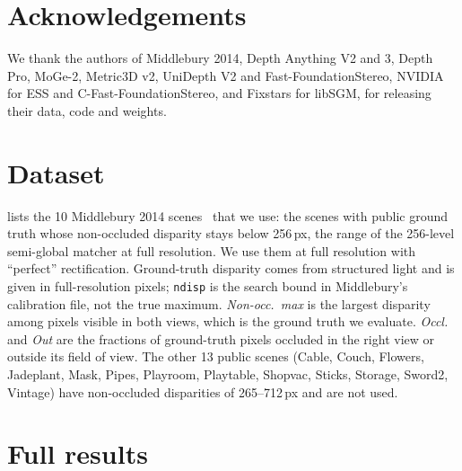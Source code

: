 \documentclass[10pt,twocolumn]{article}
\begin{document}
\section*{Acknowledgements}
We thank the authors of Middlebury 2014, Depth Anything V2 and 3, Depth Pro, MoGe-2, Metric3D v2,
UniDepth V2 and Fast-FoundationStereo, NVIDIA for ESS and C-Fast-FoundationStereo, and Fixstars for
libSGM, for releasing their
data, code and weights.

{\small


}

\clearpage
\onecolumn
\appendix
\section{Dataset}
\label{app:dataset}
 lists the 10 Middlebury 2014 scenes~\cite{scharstein2014middlebury} that we use: the
scenes with public ground truth whose non-occluded disparity stays below 256\,px, the range of the
256-level semi-global matcher at full resolution. We use them at full resolution with ``perfect'' rectification.
Ground-truth disparity comes from structured light and is given in full-resolution pixels;
\texttt{ndisp} is the search bound in Middlebury's calibration file, not the true maximum.
\emph{Non-occ.\ max} is the largest disparity among pixels visible in both views, which is the ground
truth we evaluate. \emph{Occl.} and \emph{Out} are the fractions of ground-truth pixels occluded in the
right view or outside its field of view. The other 13 public scenes (Cable, Couch, Flowers, Jadeplant,
Mask, Pipes, Playroom, Playtable, Shopvac, Sticks, Storage, Sword2, Vintage) have non-occluded
disparities of 265--712\,px and are not used.

\begin{table}[!h]
\centering
\caption{The 10 Middlebury 2014 scenes used (left image thumbnails). Disparities in
full-resolution pixels; depth from $Z=fB/(d+d_\text{offs})$.}
\label{tab:dataset}
\small
\resizebox{\textwidth}{!}{}
\end{table}

\section{Full results}
\label{app:results}
\begin{table}[p]
\centering
\caption{Accuracy (non-occluded ground truth only) and cost per frame on Jetson AGX Orin (MAXN).
Dens.: fraction of non-occluded ground-truth pixels with a prediction. bad-2 counts missing predictions
as errors; AbsRel and $\delta_{1.05}$ are over predicted pixels. AbsRel$^{\dagger}$: monocular output
after per-image oracle median scaling. GPU ms: median TensorRT GPU compute time for networks and median
Nsight Systems GPU-busy time for libSGM. J/frame: dynamic SoC energy. Accuracy of Depth Pro, Depth Anything V2-S at full resolution,
Depth Anything~3, MoGe-2, Metric3D v2 and UniDepth V2 is from FP32 PyTorch and their timing from the
FP16 engines (\cref{sec:fp16}).}
\label{tab:main}
\small
{}
\end{table}
\end{document}
